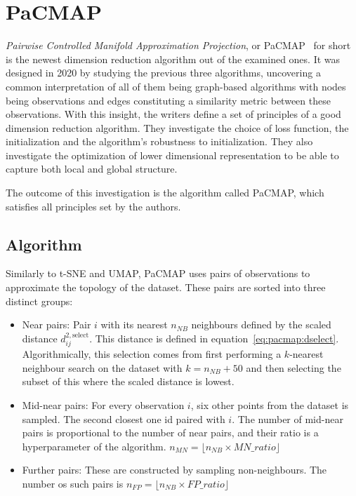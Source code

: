 \section{PaCMAP}\label{sec:pacmap}

\textit{Pairwise Controlled Manifold Approximation Projection}, or PaCMAP~\cite{bib:pacmap} for short is the newest dimension reduction algorithm out of the examined ones. It was designed in 2020 by studying the previous three algorithms, uncovering a common interpretation of all of them being graph-based algorithms with nodes being observations and edges constituting a similarity metric between these observations. With this insight, the writers define a set of principles of a good dimension reduction algorithm. They investigate the choice of loss function, the initialization and the algorithm's robustness to initialization. They also investigate the optimization of lower dimensional representation to be able to capture both local and global structure.

The outcome of this investigation is the algorithm called PaCMAP, which satisfies all principles set by the authors.

\subsection{Algorithm}

Similarly to t-SNE and UMAP, PaCMAP uses pairs of observations to approximate the topology of the dataset. These pairs are sorted into three distinct groups:

\begin{itemize}
	\item Near pairs: Pair $i$ with its nearest $n_{NB}$ neighbours defined by the scaled distance $d^{2,\textrm{select}}_{ij}$. This distance is defined in equation~\eqref{eq:pacmap:dselect}. Algorithmically, this selection comes from first performing a $k$-nearest neighbour search on the dataset with $k = n_{NB} + 50$ and then selecting the subset of this where the scaled distance is lowest.
	\item Mid-near pairs: For every observation $i$, six other points from the dataset is sampled. The second closest one id paired with $i$. The number of mid-near pairs is proportional to the number of near pairs, and their ratio is a hyperparameter of the algorithm. $n_{MN} = \lfloor n_{NB} \times MN\_ratio\rfloor$
	\item Further pairs: These are constructed by sampling non-neighbours. The number os such pairs is $n_{FP} = \lfloor n_{NB} \times FP\_ratio \rfloor$
\end{itemize}

